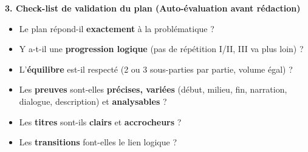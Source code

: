 \documentclass[11pt]{article}
\begin{document}
\begin{methode}
\textbf{3. Check-list de validation du plan (Auto-évaluation avant rédaction)}
\begin{itemize}
    \item[\textbullet] Le plan répond-il \textbf{exactement} à la problématique ?
    \item[\textbullet] Y a-t-il une \textbf{progression logique} (pas de répétition I/II, III va plus loin) ?
    \item[\textbullet] L'\textbf{équilibre} est-il respecté (2 ou 3 sous-parties par partie, volume égal) ?
    \item[\textbullet] Les \textbf{preuves} sont-elles \textbf{précises, variées} (début, milieu, fin, narration, dialogue, description) et \textbf{analysables} ?
    \item[\textbullet] Les \textbf{titres} sont-ils \textbf{clairs} et \textbf{accrocheurs} ?
    \item[\textbullet] Les \textbf{transitions} font-elles le lien logique ?
\end{itemize}
\end{methode}
\end{document}
